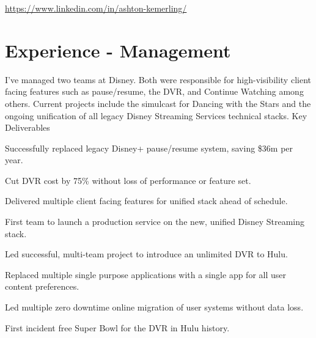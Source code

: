 \documentclass[]{deedy-resume-openfont}
\begin{document}
%
%
\lastupdated

%
%



\href{https://www.linkedin.com/in/ashton-kemerling/}{https://www.linkedin.com/in/ashton-kemerling/}

\begin{center}
\end{center}

\section{Experience - Management}

\vspace{\topsep} %
I've managed two teams at Disney. Both were responsible for high-visibility client facing features such as pause/resume, the DVR, and Continue Watching among others. Current projects include the simulcast for Dancing with the Stars and the ongoing unification of all legacy Disney Streaming Services technical stacks.
\vspace{\topsep}
\newline
Key Deliverables
\begin{tightemize}
\item Successfully replaced legacy Disney+ pause/resume system, saving \$36m per year.
\item Cut DVR cost by 75\% without loss of performance or feature set.
\item Delivered multiple client facing features for unified stack ahead of schedule.
\item First team to launch a production service on the new, unified Disney Streaming stack.
\item Led successful, multi-team project to introduce an unlimited DVR to Hulu.
\item Replaced multiple single purpose applications with a single app for all user content preferences.
\item Led multiple zero downtime online migration of user systems without data loss.
\item First incident free Super Bowl for the DVR in Hulu history.
\end{tightemize}
\end{document}
